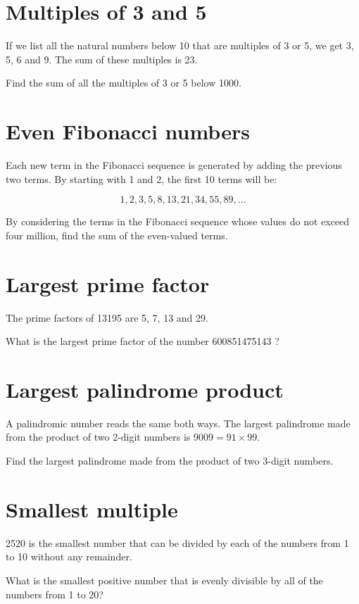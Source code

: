 \section{Multiples of 3 and 5} \label{pb.001}
If we list all the natural numbers below 10 that are multiples of 3 or 5, we get 3, 5, 6 and 9. The sum of these multiples is 23.

Find the sum of all the multiples of 3 or 5 below 1000.


\section{Even Fibonacci numbers} \label{pb.002}
Each new term in the Fibonacci sequence is generated by adding the previous two terms. By starting with 1 and 2, the first 10 terms will be:

$$1, 2, 3, 5, 8, 13, 21, 34, 55, 89, ...$$

By considering the terms in the Fibonacci sequence whose values do not exceed four million, find the sum of the even-valued terms.


\section{Largest prime factor} \label{pb.003}

The prime factors of 13195 are 5, 7, 13 and 29.

What is the largest prime factor of the number 600851475143 ?


\section{Largest palindrome product} \label{pb.004} 

A palindromic number reads the same both ways. The largest palindrome made from the product of two 2-digit numbers is $9009 = 91 \times 99$.

Find the largest palindrome made from the product of two 3-digit numbers.


\section{Smallest multiple} \label{pb.005}

2520 is the smallest number that can be divided by each of the numbers from 1 to 10 without any remainder.

What is the smallest positive number that is evenly divisible by all of the numbers from 1 to 20?


